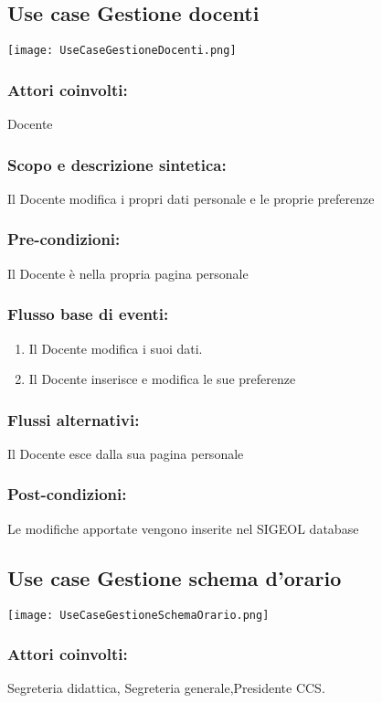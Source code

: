 \documentclass[11pt,a4paper]{article}
\begin{document}
\subsection{Use case Gestione docenti}
\begin{center} 
 \texttt{[image: UseCaseGestioneDocenti.png]}
\end{center}
\subsubsection*{Attori coinvolti:}
Docente
\subsubsection*{Scopo e descrizione sintetica:}
Il Docente modifica i propri dati personale e le proprie preferenze
\subsubsection*{Pre-condizioni:}
Il Docente è nella propria pagina personale
\subsubsection*{Flusso base di eventi:}
\begin{enumerate}
 \item Il Docente modifica i suoi dati. 
 \item Il Docente inserisce e modifica le sue preferenze
\end{enumerate}
\subsubsection*{Flussi alternativi:}
Il Docente esce dalla sua pagina personale
\subsubsection*{Post-condizioni:}
Le modifiche apportate vengono inserite nel SIGEOL database
\subsection{Use case Gestione schema d'orario}
\begin{center} 
 \texttt{[image: UseCaseGestioneSchemaOrario.png]}
\end{center}
\subsubsection*{Attori coinvolti:}
Segreteria didattica, Segreteria generale,Presidente CCS.
\end{document}
